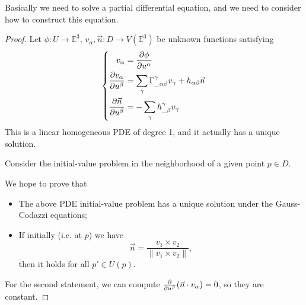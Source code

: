 Basically we need to solve a partial differential equation,
and we need to consider how to construct this equation.

\begin{proof}[Proof]
    Let $\phi: U\to \mathbb{E}^3$,
	$v_\alpha, \vec{n}: D\to V(\mathbb{E}^3)$ be unknown functions
	satisfying
	\[
	\left\{
	\begin{aligned}
		v_\alpha &= \frac{\partial \phi}{\partial u^\alpha}\\
		\frac{\partial v_\alpha}{\partial u^\beta} &=
		\sum_\gamma \Gamma_{\_\alpha\beta}^\gamma v_\gamma
		+ h_{\alpha\beta}\vec{n}\\
		\frac{\partial \vec{n}}{\partial u^\beta} &=
		- \sum_\gamma h_{\_\beta}^\gamma v_\gamma
	\end{aligned}\right.
	\]
	This is a linear homogeneous PDE of degree 1, and
	it actually has a unique solution.

	Consider the initial-value problem in the neighborhood of
	a given point $p\in D$.

	We hope to prove that
	\begin{itemize}
		\item The above PDE initial-value problem has a unique
			solution under the Gauss-Codazzi equations;
		\item If initially (i.e. at $p$) we have
			\[
			\vec{n} = \frac{v_1\times v_2}{\lVert v_1\times v_2 \rVert},
			\]
			then it holds for all $p'\in U(p)$.
	\end{itemize}

	For the second statement, we can compute
	$\frac{\partial }{\partial u^\beta}(\vec{n}\cdot v_\alpha) = 0$,
	so they are constant.
\end{proof}

